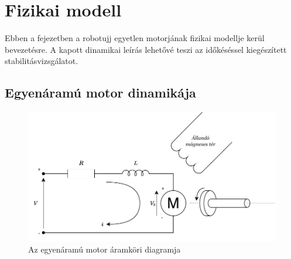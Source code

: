 \chapter{Fizikai modell}\label{chap:physical_system}

Ebben a fejezetben a robotujj egyetlen motorjának fizikai modellje kerül bevezetésre. A kapott dinamikai leírás
lehetővé teszi az időkéséssel kiegészített stabilitásvizsgálatot. 

\section{Egyenáramú motor dinamikája}

\begin{figure}[b!]
\begin{center}
\includegraphics[width=\textwidth]{images/motor_model_electric.pdf}
\caption{Az egyenáramú motor áramköri diagramja}
\label{fig:dc_motor_electric}
\end{center}
\end{figure}

